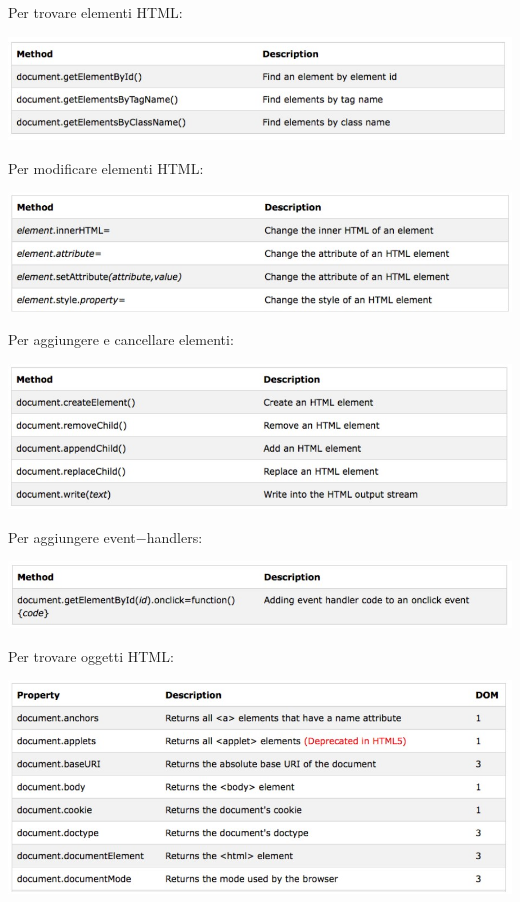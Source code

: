 \noindent Per trovare elementi HTML:
\begin{center}
    \includegraphics[scale=0.4]{Images/TecnologieWeb/8/PerTrovareElementi.jpg}
\end{center}
Per modificare elementi HTML:
\begin{center}
    \includegraphics[scale=0.4]{Images/TecnologieWeb/8/PerModificareElementi.jpg}
\end{center}
Per aggiungere e cancellare elementi:
\begin{center}
    \includegraphics[scale=0.4]{Images/TecnologieWeb/8/PerEliminareElementi.jpg}
\end{center}
Per aggiungere event$-$handlers:
\begin{center}
    \includegraphics[scale=0.4]{Images/TecnologieWeb/8/PerAggiungereEventHandlers.jpg}
\end{center}
Per trovare oggetti HTML:
\begin{center}
    \includegraphics[scale=0.4]{Images/TecnologieWeb/8/PerTrovareOggetti.jpg}
\end{center}
